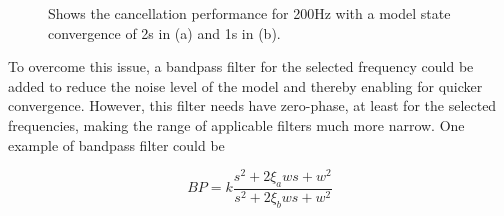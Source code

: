 \begin{figure}[h!]
  \centering %
  \qquad
  \caption{\label{fig:convergence} Shows the cancellation performance for 200Hz with a model state convergence of 2s in (a) and 1s in (b).}
\end{figure}

To overcome this issue, a bandpass filter for the selected frequency could be added to reduce the noise level of the model and thereby enabling for quicker convergence. However, this filter needs have zero-phase, at least for the selected frequencies, making the range of applicable filters much more narrow. One example of bandpass filter could be

\begin{equation}
  BP = k\frac{s^2 + 2\xi_aws + w^2}{s^2 + 2\xi_bws + w^2}
\end{equation}

